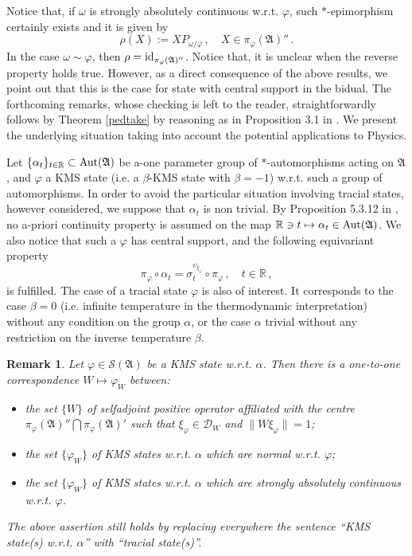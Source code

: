 \documentclass[12pt]{amsart}
\numberwithin{equation}{section}
\def\cd{{\mathcal D}}
\def\cs{{\mathcal S}}
\def\ga{{\mathfrak A}} \def\gpa{{\mathfrak a}}
\def\br{{\mathbb R}}
\def\a{\alpha}
\def\b{\beta}
\def\r{\rho}\def\R{\mathop{\rm P}}
\def\s{\sigma} \def\S{\Sigma}
\def\f{\varphi}\def\ff{\phi} \def\F{\Phi}
\def\om{\omega} \def\Om{\Omega}
\def\id{\hbox{id}}
\newtheorem{rem}[thm]{Remark}
\def\aut{\mathop{\rm Aut}}
\begin{document}
Notice that, if $\om$ is strongly absolutely continuous w.r.t. $\f$, such $*$-epimorphism certainly exists and it is given by
$$
\r(X):=XP_{\om/\f}\,,\quad X\in\pi_\f(\ga)''\,.
$$
In the case $\om\sim\f$, then $\r=\id_{\pi_\f(\ga)''}$. Notice that, it is unclear when the reverse property holds true. However, as a direct consequence of the above results, we point out that this is the case for state with central support in the bidual. The forthcoming remarks, whose checking is left to the reader, straightforwardly follows by Theorem \ref{pedtake} by reasoning as in Proposition 3.1 in \cite{BF}. We present the underlying situation taking into account the potential applications to Physics. 

Let $\{\a_t\}_{t\in\br}\subset\aut(\ga)$ be a-one parameter group of $*$-automorphisms acting on $\ga$, and $\f$ a KMS state (i.e. a $\b$-KMS state with $\b=-1$) w.r.t. such a group of automorphisms. In order to avoid the particular situation involving tracial states, however considered, we suppose that $\a_t$ is non trivial. By Proposition 5.3.12 in \cite{BR},
no a-priori continuity property is assumed on the map 
$\br\ni t\mapsto\a_t\in\aut(\ga)$. We also notice that such a $\f$ has central support, and the following equivariant property
$$
\pi_\f\circ\a_t=\s^{\upsilon_{\xi_\f}}_t\circ\pi_\f\,,\quad t\in\br\,,
$$
is fulfilled. The case of a tracial state $\f$ is also of interest. It corresponds to the case $\b=0$ (i.e. infinite temperature in the thermodynamic interpretation) without any condition on the group $\a$, or the case $\a$ trivial without any restriction on the inverse temperature $\b$.
\begin{rem}
\label{vuhlos}
Let $\f\in\cs(\ga)$ be a KMS state w.r.t. $\a$. Then there is a one-to-one correspondence $W\mapsto\f_W$ between:
\begin{itemize}
\item[(a)] the set $\{W\}$ of selfadjoint positive operator affiliated with the centre $\pi_\f(\ga)''\bigcap\pi_\f(\ga)'$ such that $\xi_\f\in\cd_W$ and
$\|W\xi_\f\|=1$;
\item[(b1)] the set $\{\f_W\}$ of KMS states w.r.t. $\a$ which are normal w.r.t. $\f$;
\item[(b2)] the set $\{\f_W\}$ of KMS states w.r.t. $\a$ which are strongly absolutely continuous w.r.t. $\f$.
\end{itemize}
The above assertion still holds by replacing everywhere the sentence ``KMS state(s) w.r.t. $\a$'' with ``tracial state(s)''.
\end{rem}
\end{document}
